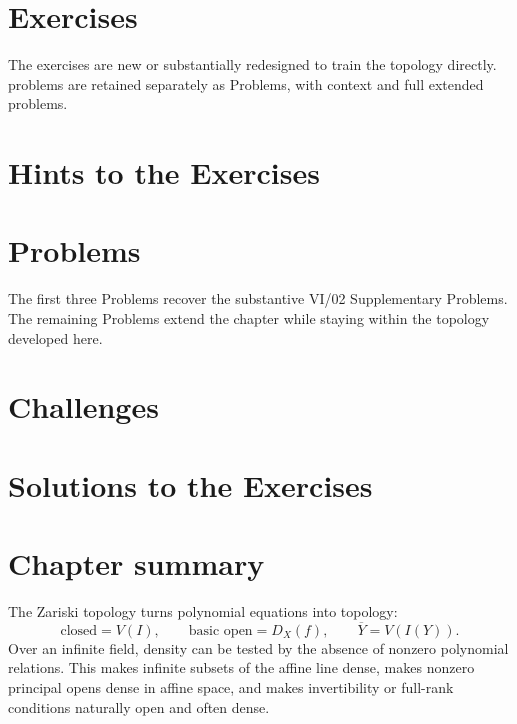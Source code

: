 

\section{Exercises}
\label{sec:vi02-exercises}
The exercises are new or substantially redesigned to train the topology directly.  problems are retained separately as Problems, with context and full extended problems.


\ifdefined\IncludeExerciseHints
\section{Hints to the Exercises}
\label{sec:vi02-exercise-hints}

\fi

\section{Problems}
\label{sec:vi02-problems}
The first three Problems recover the substantive VI/02 Supplementary Problems.  The remaining
Problems extend the chapter while staying within the topology developed here.


\section{Challenges}
\label{sec:vi02-challenges}


\ifdefined\IncludeExerciseSolutions
\section{Solutions to the Exercises}
\label{sec:vi02-exercise-solutions}

\fi

\section{Chapter summary}
\label{sec:vi02-summary}

The Zariski topology turns polynomial equations into topology:
\[
\text{closed}=V(I),
\qquad
\text{basic open}=D_X(f),
\qquad
\overline Y=V(I(Y)).
\]
Over an infinite field, density can be tested by the absence of nonzero polynomial
relations.  This makes infinite subsets of the affine line dense, makes nonzero principal
opens dense in affine space, and makes invertibility or full-rank conditions naturally open
and often dense.

